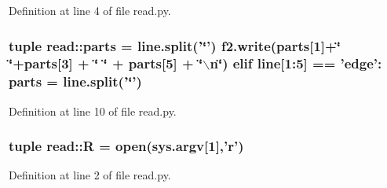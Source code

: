 \-Definition at line 4 of file read.\-py.

\hypertarget{namespaceread_a39497ffc1642e3fa13cd1f57a935ac5c}{
\subsubsection[{parts}]{\setlength{\rightskip}{0pt plus 5cm}tuple {\bf read\-::parts} = line.\-split('\char`\"{}') f2.\-write({\bf parts}\mbox{[}1\mbox{]}+\char`\"{} \char`\"{}+{\bf parts}\mbox{[}3\mbox{]} + \char`\"{} \char`\"{} + {\bf parts}\mbox{[}5\mbox{]} + \char`\"{}$\backslash$n\char`\"{}) elif line\mbox{[}1\-:5\mbox{]} == 'edge'\-: {\bf parts} = line.\-split('\char`\"{}')}}\label{namespaceread_a39497ffc1642e3fa13cd1f57a935ac5c}


\-Definition at line 10 of file read.\-py.

\hypertarget{namespaceread_a34c7733413dd5c3164605c8b41f31f6d}{
\subsubsection[{\-R}]{\setlength{\rightskip}{0pt plus 5cm}tuple {\bf read\-::\-R} = open(sys.\-argv\mbox{[}1\mbox{]},'r')}}\label{namespaceread_a34c7733413dd5c3164605c8b41f31f6d}


\-Definition at line 2 of file read.\-py.

